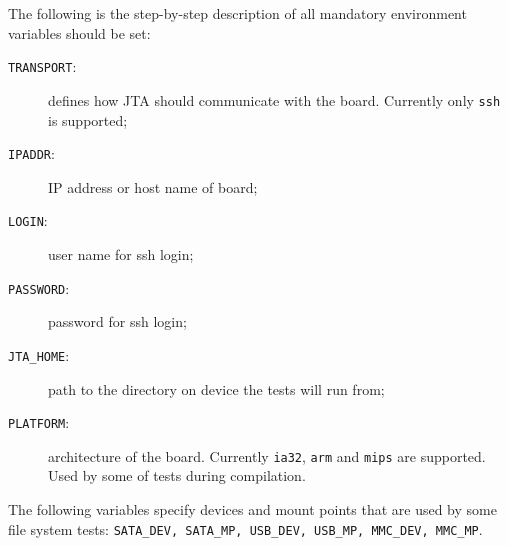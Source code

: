 The following is the step-by-step description of all mandatory environment variables should be set:

\begin{description}
\item[\texttt{TRANSPORT}:] defines how JTA should communicate with the board. 
  Currently only \texttt{ssh} is supported;
\item[\texttt{IPADDR}:]  IP address or host name of board;
\item[\texttt{LOGIN}:]  user name for ssh login;
\item[\texttt{PASSWORD}:] password for ssh login;
\item[\texttt{JTA\_HOME}:] path to the directory on device the tests will run from;
\item[\texttt{PLATFORM}:] architecture of the board. 
  Currently \texttt{ia32}, \texttt{arm} and \texttt{mips} are supported. Used by some of tests during compilation.
\end{description}

The following variables specify devices and mount points that are used by some 
file system tests: \texttt{SATA\_DEV, SATA\_MP, USB\_DEV, USB\_MP, MMC\_DEV, MMC\_MP}.





